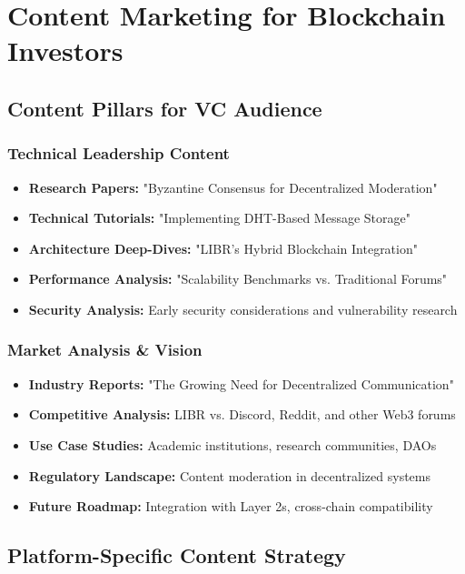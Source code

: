 \documentclass[12pt,a4paper]{article}
\begin{document}
\section{Content Marketing for Blockchain Investors}

\subsection{Content Pillars for VC Audience}

\subsubsection{Technical Leadership Content}
\begin{itemize}
    \item \textbf{Research Papers:} "Byzantine Consensus for Decentralized Moderation"
    \item \textbf{Technical Tutorials:} "Implementing DHT-Based Message Storage"
    \item \textbf{Architecture Deep-Dives:} "LIBR's Hybrid Blockchain Integration"
    \item \textbf{Performance Analysis:} "Scalability Benchmarks vs. Traditional Forums"
    \item \textbf{Security Analysis:} Early security considerations and vulnerability research
\end{itemize}

\subsubsection{Market Analysis \& Vision}
\begin{itemize}
    \item \textbf{Industry Reports:} "The Growing Need for Decentralized Communication"
    \item \textbf{Competitive Analysis:} LIBR vs. Discord, Reddit, and other Web3 forums
    \item \textbf{Use Case Studies:} Academic institutions, research communities, DAOs
    \item \textbf{Regulatory Landscape:} Content moderation in decentralized systems
    \item \textbf{Future Roadmap:} Integration with Layer 2s, cross-chain compatibility
\end{itemize}

\subsection{Platform-Specific Content Strategy}
\end{document}
